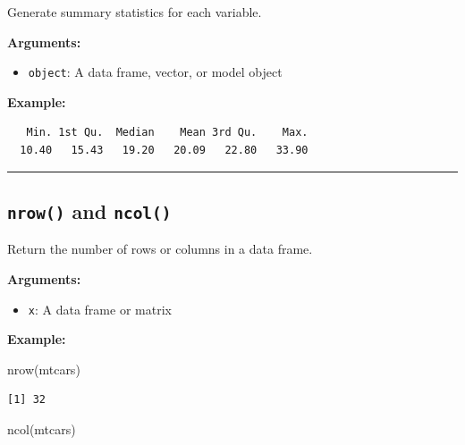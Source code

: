 \documentclass[
  letterpaper,
  DIV=11,
  numbers=noendperiod]{scrreprt}
\newenvironment{Shaded}{\begin{snugshade}}{\end{snugshade}}
\newcommand{\FunctionTok}[1]{\textcolor[rgb]{0.28,0.35,0.67}{#1}}
\newcommand{\NormalTok}[1]{\textcolor[rgb]{0.00,0.23,0.31}{#1}}
\newcommand{\SpecialCharTok}[1]{\textcolor[rgb]{0.37,0.37,0.37}{#1}}
\providecommand{\tightlist}{%
  \setlength{\itemsep}{0pt}\setlength{\parskip}{0pt}}
\begin{document}
Generate summary statistics for each variable.

\textbf{Arguments:}

\begin{itemize}
\tightlist
\item
  \texttt{object}: A data frame, vector, or model object
\end{itemize}

\textbf{Example:}

\begin{Shaded}
\end{Shaded}

\begin{verbatim}
   Min. 1st Qu.  Median    Mean 3rd Qu.    Max. 
  10.40   15.43   19.20   20.09   22.80   33.90 
\end{verbatim}

\begin{center}\rule{0.5\linewidth}{0.5pt}\end{center}

\subsection{\texorpdfstring{\texttt{nrow()} and
\texttt{ncol()}}{nrow() and ncol()}}\label{nrow-and-ncol}

Return the number of rows or columns in a data frame.

\textbf{Arguments:}

\begin{itemize}
\tightlist
\item
  \texttt{x}: A data frame or matrix
\end{itemize}

\textbf{Example:}

\begin{Shaded}
\begin{Highlighting}[]
\FunctionTok{nrow}\NormalTok{(mtcars)}
\end{Highlighting}
\end{Shaded}

\begin{verbatim}
[1] 32
\end{verbatim}

\begin{Shaded}
\begin{Highlighting}[]
\FunctionTok{ncol}\NormalTok{(mtcars)}
\end{Highlighting}
\end{Shaded}
\end{document}
